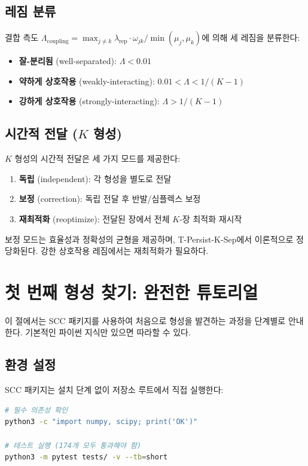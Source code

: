 \subsection{레짐 분류}

결합 측도 $\Lambda_{\mathrm{coupling}} = \max_{j \neq k} \lambda_{\mathrm{rep}} \cdot \omega_{jk} / \min(\mu_j, \mu_k)$에 의해 세 레짐을 분류한다:
\begin{itemize}
    \item \textbf{잘-분리됨} (well-separated): $\Lambda < 0.01$
    \item \textbf{약하게 상호작용} (weakly-interacting): $0.01 < \Lambda < 1/(K-1)$
    \item \textbf{강하게 상호작용} (strongly-interacting): $\Lambda > 1/(K-1)$
\end{itemize}

\subsection{시간적 전달 ($K$ 형성)}

$K$ 형성의 시간적 전달은 세 가지 모드를 제공한다:
\begin{enumerate}
    \item \textbf{독립} (independent): 각 형성을 별도로 전달
    \item \textbf{보정} (correction): 독립 전달 후 반발/심플렉스 보정
    \item \textbf{재최적화} (reoptimize): 전달된 장에서 전체 $K$-장 최적화 재시작
\end{enumerate}

보정 모드는 효율성과 정확성의 균형을 제공하며, T-Persist-K-Sep에서 이론적으로 정당화된다. 강한 상호작용 레짐에서는 재최적화가 필요하다.


\section{첫 번째 형성 찾기: 완전한 튜토리얼}
\label{sec:first-formation}

이 절에서는 SCC 패키지를 사용하여 처음으로 형성을 발견하는 과정을 단계별로 안내한다. 기본적인 파이썬 지식만 있으면 따라할 수 있다.

\subsection{환경 설정}

SCC 패키지는 설치 단계 없이 저장소 루트에서 직접 실행한다:
\begin{lstlisting}[language=bash, caption={환경 확인}]
# 필수 의존성 확인
python3 -c "import numpy, scipy; print('OK')"

# 테스트 실행 (174개 모두 통과해야 함)
python3 -m pytest tests/ -v --tb=short
\end{lstlisting}

